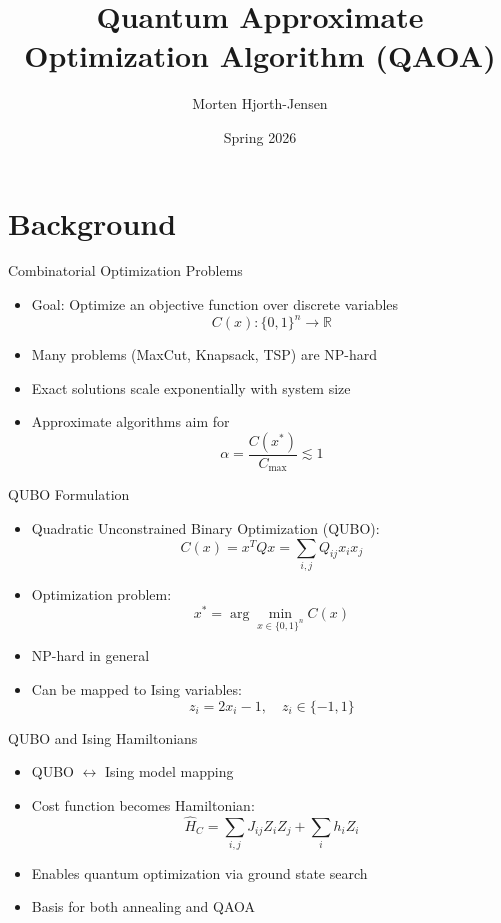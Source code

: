 \documentclass{beamer}
\title{Quantum Approximate Optimization Algorithm (QAOA)}
\author{Morten Hjorth-Jensen}
\date{Spring 2026}
\begin{document}
\frame{\titlepage}

\section{Background}

\begin{frame}{Combinatorial Optimization Problems}
\begin{itemize}
\item Goal: Optimize an objective function over discrete variables
\[
C(x): \{0,1\}^n \rightarrow \mathbb{R}
\]
\item Many problems (MaxCut, Knapsack, TSP) are NP-hard
\item Exact solutions scale exponentially with system size
\item Approximate algorithms aim for
\[
\alpha = \frac{C(x^*)}{C_{\max}} \lesssim 1
\]
\end{itemize}
\end{frame}


\begin{frame}{QUBO Formulation}
\begin{itemize}
\item Quadratic Unconstrained Binary Optimization (QUBO):
\[
C(x) = x^T Q x = \sum_{i,j} Q_{ij} x_i x_j
\]
\item Optimization problem:
\[
x^* = \arg\min_{x \in \{0,1\}^n} C(x)
\]
\item NP-hard in general
\item Can be mapped to Ising variables:
\[
z_i = 2x_i - 1, \quad z_i \in \{-1,1\}
\]
\end{itemize}
\end{frame}


\begin{frame}{QUBO and Ising Hamiltonians}
\begin{itemize}
\item QUBO $\leftrightarrow$ Ising model mapping
\item Cost function becomes Hamiltonian:
\[
\hat{H}_C = \sum_{i,j} J_{ij} Z_i Z_j + \sum_i h_i Z_i
\]
\item Enables quantum optimization via ground state search
\item Basis for both annealing and QAOA
\end{itemize}
\end{frame}
\end{document}
